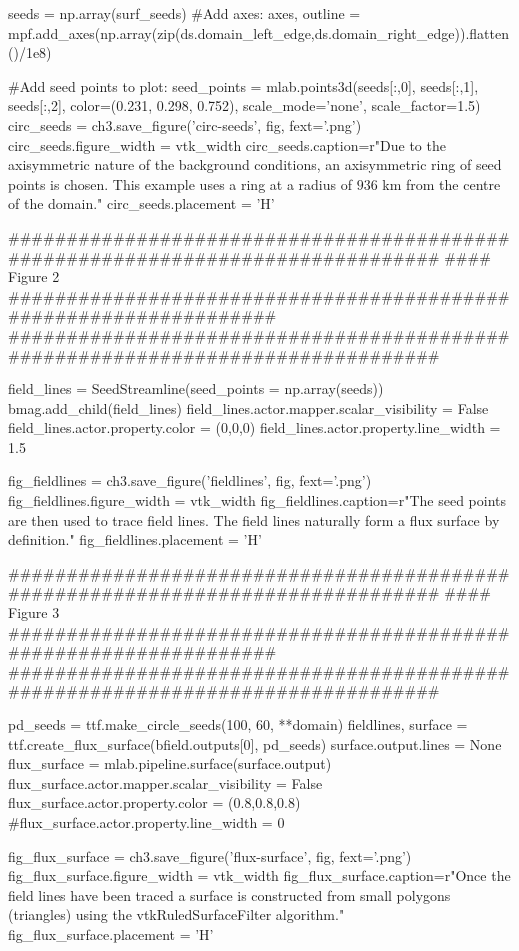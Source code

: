 \begin{pycode}[chapter3a]
seeds = np.array(surf_seeds)
#Add axes:
axes, outline = mpf.add_axes(np.array(zip(ds.domain_left_edge,ds.domain_right_edge)).flatten()/1e8)

#Add seed points to plot:
seed_points = mlab.points3d(seeds[:,0], seeds[:,1], seeds[:,2],
color=(0.231, 0.298, 0.752), scale_mode='none',
scale_factor=1.5)
circ_seeds = ch3.save_figure('circ-seeds', fig, fext='.png')
circ_seeds.figure_width = vtk_width
circ_seeds.caption=r"Due to the axisymmetric nature of the background conditions, an axisymmetric ring of seed points is chosen. This example uses a ring at a radius of $936$ km from the centre of the domain."
circ_seeds.placement = 'H'

################################################################################
#### Figure 2 ##################################################################
################################################################################

field_lines = SeedStreamline(seed_points = np.array(seeds))
bmag.add_child(field_lines)
field_lines.actor.mapper.scalar_visibility = False
field_lines.actor.property.color = (0,0,0)
field_lines.actor.property.line_width = 1.5

fig_fieldlines = ch3.save_figure('fieldlines', fig, fext='.png')
fig_fieldlines.figure_width = vtk_width
fig_fieldlines.caption=r"The seed points are then used to trace field lines. The field lines naturally form a flux surface by definition."
fig_fieldlines.placement = 'H'

################################################################################
#### Figure 3 ##################################################################
################################################################################

pd_seeds = ttf.make_circle_seeds(100, 60, **domain)
fieldlines, surface = ttf.create_flux_surface(bfield.outputs[0], pd_seeds)
surface.output.lines = None
flux_surface = mlab.pipeline.surface(surface.output)
flux_surface.actor.mapper.scalar_visibility = False
flux_surface.actor.property.color = (0.8,0.8,0.8)
#flux_surface.actor.property.line_width = 0

fig_flux_surface = ch3.save_figure('flux-surface', fig, fext='.png')
fig_flux_surface.figure_width = vtk_width
fig_flux_surface.caption=r"Once the field lines have been traced a surface is constructed from small polygons (triangles) using the vtkRuledSurfaceFilter algorithm."
fig_flux_surface.placement = 'H'


\end{pycode}
